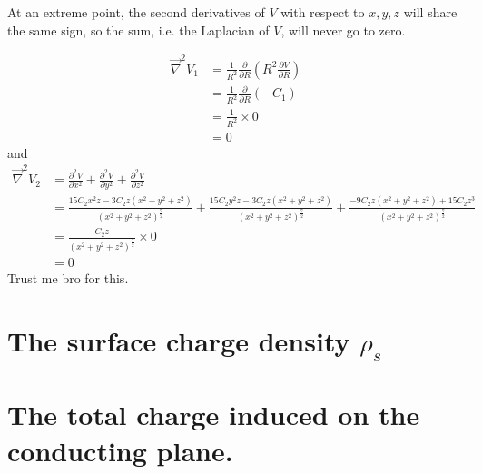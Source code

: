 \documentclass[answers]{exam}
\begin{document}
\begin{questions}

\begin{solution}
    At an extreme point, the second derivatives of $V$ with respect to $x,y,z$ will share the same sign, so the sum, i.e. the Laplacian of $V$, will never go to zero.
\end{solution}


\begin{solution}
    \begin{align*}
        \vec\nabla^2V_1 &= \frac{1}{R^2} \frac{\partial}{\partial R}\left(R^2 \frac{\partial V}{\partial R}\right) \\
                        &= \frac{1}{R^2} \frac{\partial}{\partial R}(-C_1) \\
                        &= \frac{1}{R^2} \times 0 \\
                        &= 0
    \end{align*}
    and
    \begin{align*}
        \vec\nabla^2V_2 &= \frac{\partial^2V}{\partial x^2} + \frac{\partial^2V}{\partial y^2} + \frac{\partial^2V}{\partial z^2} \\
                        &= \frac{15C_2x^2z - 3C_2z(x^2+y^2+z^2)}{(x^2+y^2+z^2)^{\frac{7}{2}}} + \frac{15C_2y^2z - 3C_2z(x^2+y^2+z^2)}{(x^2+y^2+z^2)^{\frac{7}{2}}} + \frac{-9C_2z(x^2+y^2+z^2) + 15C_2z^3}{(x^2+y^2+z^2)^{\frac{7}{2}}} \\
                        &= \frac{C_2z}{(x^2+y^2+z^2)^{\frac{7}{2}}} \times 0 \\
                        &= 0
    \end{align*}
    Trust me bro for this.
\end{solution}


\begin{parts}
    \part{The surface charge density $\rho_s$}
    \part{The total charge induced on the conducting plane.}
\end{parts}


\end{questions}
\end{document}
